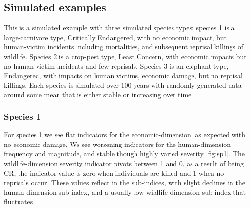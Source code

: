 \documentclass[fleqn,10pt]{olplainarticle}
\begin{document}
\subsection*{Simulated examples}
This is a simulated example with three simulated species types:
species 1 is a large-carnivore type, Critically Endangered, with no economic impact, but human-victim incidents including mortalities, and subsequent reprisal killings of wildlife. Species 2 is a crop-pest type, Least Concern, with economic impacts but no human-victim incidents and few reprisals. Species 3 is an elephant type, Endangered, with impacts on human victims, economic damage, but no reprisal killings. Each species is simulated over 100 years with randomly generated data around some mean that is either stable or increasing over time.

\subsubsection*{Species 1}
For species 1 we see flat indicators for the economic-dimension, as expected with no economic damage. We see worsening indicators for the human-dimension frequency and magnitude, and stable though highly varied severity \ref{fig:sp1}. The wildlife-dimension severity indicator pivots between 1 and 0, as a result of being CR, the indicator value is zero when individuals are killed and 1 when no reprisals occur. These values reflect in the sub-indices, with slight declines in the human-dimension sub-index, and a usually low wildlife-dimension sub-index that fluctuates 
\end{document}
